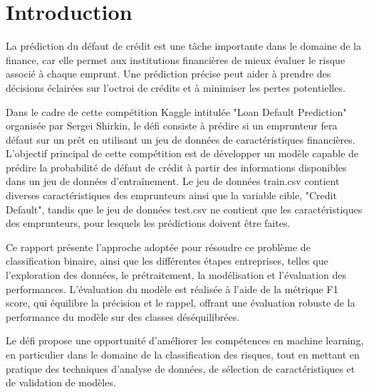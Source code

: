 \chapter*{Introduction}

La prédiction du défaut de crédit est une tâche importante dans le domaine de la finance, car elle permet aux institutions financières de mieux évaluer le risque associé à chaque emprunt. Une prédiction précise peut aider à prendre des décisions éclairées sur l'octroi de crédits et à minimiser les pertes potentielles.

Dans le cadre de cette compétition Kaggle intitulée "Loan Default Prediction" organisée par Sergei Shirkin, le défi consiste à prédire si un emprunteur fera défaut sur un prêt en utilisant un jeu de données de caractéristiques financières. L'objectif principal de cette compétition est de développer un modèle capable de prédire la probabilité de défaut de crédit à partir des informations disponibles dans un jeu de données d'entraînement. Le jeu de données train.csv contient diverses caractéristiques des emprunteurs ainsi que la variable cible, "Credit Default", tandis que le jeu de données test.csv ne contient que les caractéristiques des emprunteurs, pour lesquels les prédictions doivent être faites.

Ce rapport présente l'approche adoptée pour résoudre ce problème de classification binaire, ainsi que les différentes étapes entreprises, telles que l'exploration des données, le prétraitement, la modélisation et l'évaluation des performances. L'évaluation du modèle est réalisée à l'aide de la métrique F1 score, qui équilibre la précision et le rappel, offrant une évaluation robuste de la performance du modèle sur des classes déséquilibrées.


Le défi propose une opportunité d'améliorer les compétences en machine learning, en particulier dans le domaine de la classification des risques, tout en mettant en pratique des techniques d'analyse de données, de sélection de caractéristiques et de validation de modèles.